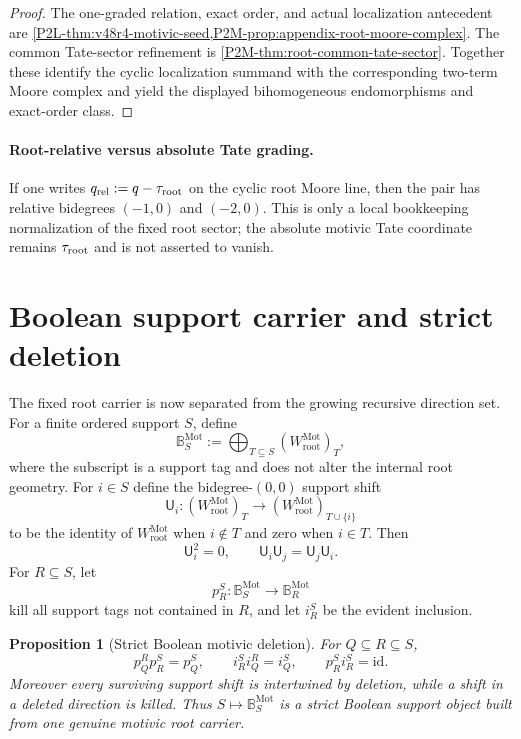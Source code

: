 \documentclass[11pt]{article}
\newtheorem{proposition}[theorem]{Proposition}
\theoremstyle{remark}
\newcommand{\Mot}{\mathrm{Mot}}
\newcommand{\rootc}{\mathrm{root}}
\begin{document}
\begin{proof}
The one-graded relation, exact order, and actual localization antecedent are
\cref{P2L-thm:v48r4-motivic-seed,P2M-prop:appendix-root-moore-complex}.  The
common Tate-sector refinement is
\cref{P2M-thm:root-common-tate-sector}.  Together these identify the cyclic
localization summand with the corresponding two-term Moore complex and yield
the displayed bihomogeneous endomorphisms and exact-order class.
\end{proof}

\paragraph{Root-relative versus absolute Tate grading.}
If one writes $q_{\rm rel}:=q-\tau_{\rm root}$ on the cyclic root Moore line,
then the pair has relative bidegrees $(-1,0)$ and $(-2,0)$.  This is only a
local bookkeeping normalization of the fixed root sector; the absolute
motivic Tate coordinate remains $\tau_{\rm root}$ and is not asserted to
vanish.

\section{Boolean support carrier and strict deletion}


The fixed root carrier is now separated from the growing recursive direction
set.  For a finite ordered support $S$, define
\begin{equation}
 \boxed{
 \mathbb B_S^{\Mot}
 :=\bigoplus_{T\subseteq S}(W_{\rootc}^{\Mot})_T,}
\end{equation}
where the subscript is a support tag and does not alter the internal root
geometry.  For $i\in S$ define the bidegree-$(0,0)$ support shift
\begin{equation}
 \mathsf U_i:(W_{\rootc}^{\Mot})_T
 \longrightarrow(W_{\rootc}^{\Mot})_{T\cup\{i\}}
\end{equation}
to be the identity of $W_{\rootc}^{\Mot}$ when $i\notin T$ and zero when
$i\in T$.  Then
\[
 \mathsf U_i^2=0,
 \qquad
 \mathsf U_i\mathsf U_j=\mathsf U_j\mathsf U_i.
\]
For $R\subseteq S$, let
\[
 p_R^S:\mathbb B_S^{\Mot}\to\mathbb B_R^{\Mot}
\]
kill all support tags not contained in $R$, and let $i_R^S$ be the evident
inclusion.

\begin{proposition}[Strict Boolean motivic deletion]
\label{P2M-prop:v19-boolean-motivic-deletion}
For $Q\subseteq R\subseteq S$,
\[
 p_Q^Rp_R^S=p_Q^S,
 \qquad
 i_R^Si_Q^R=i_Q^S,
 \qquad
 p_R^Si_R^S=\mathrm{id}.
\]
Moreover every surviving support shift is intertwined by deletion, while a
shift in a deleted direction is killed.  Thus
$S\mapsto\mathbb B_S^{\Mot}$ is a strict Boolean support object built from
one genuine motivic root carrier.
\end{proposition}
\end{document}

